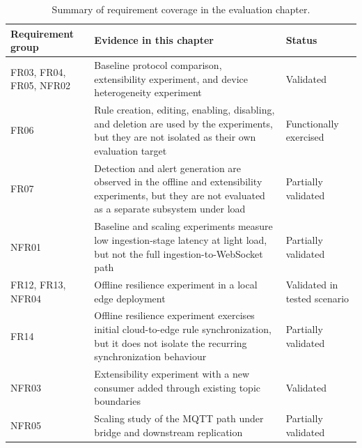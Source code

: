 \begin{table}[htbp]
    \centering
    \caption{Summary of requirement coverage in the evaluation chapter.}
    \label{tab:evaluation-requirements-summary}
    \small
    \begin{tabular}{p{3.0cm} p{6.6cm} p{2.6cm}}
        \toprule
        \textbf{Requirement group} & \textbf{Evidence in this chapter}                                                                                                                       & \textbf{Status}              \\
        \midrule
        FR03, FR04, FR05, NFR02    & Baseline protocol comparison, extensibility experiment, and device heterogeneity experiment                                                             & Validated                    \\
        FR06                       & Rule creation, editing, enabling, disabling, and deletion are used by the experiments, but they are not isolated as their own evaluation target         & Functionally exercised       \\
        FR07                       & Detection and alert generation are observed in the offline and extensibility experiments, but they are not evaluated as a separate subsystem under load & Partially validated          \\
        NFR01                      & Baseline and scaling experiments measure low ingestion-stage latency at light load, but not the full ingestion-to-WebSocket path                        & Partially validated          \\
        FR12, FR13, NFR04          & Offline resilience experiment in a local edge deployment                                                                                                & Validated in tested scenario \\
        FR14                       & Offline resilience experiment exercises initial cloud-to-edge rule synchronization, but it does not isolate the recurring synchronization behaviour     & Partially validated          \\
        NFR03                      & Extensibility experiment with a new consumer added through existing topic boundaries                                                                    & Validated                    \\
        NFR05                      & Scaling study of the \gls{MQTT} path under bridge and downstream replication                                                                            & Partially validated          \\

\end{tabular}
\end{table}

